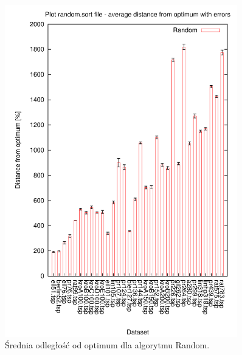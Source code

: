 \begin{figure}
\begin{center}
\includegraphics[width=0.9\textwidth]{wykresy/random_av_sort}
\end{center}
\caption{Średnia odległość od optimum dla algorytmu Random.}
\label{random_av_sort}
\end{figure}

